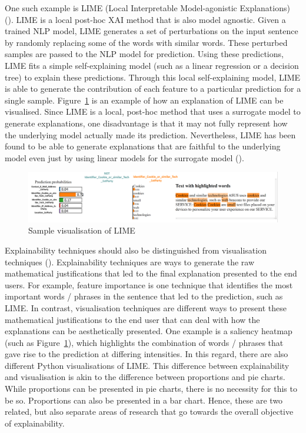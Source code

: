 One such example is LIME (Local Interpretable Model-agonistic Explanations) (\cite{lime}). LIME is a local post-hoc XAI method that is also model agnostic. Given a trained NLP model, LIME generates a set of perturbations on the input sentence by randomly replacing some of the words with similar words. These perturbed samples are passed to the NLP model for prediction. Using these predictions, LIME fits a simple self-explaining model (such as a linear regression or a decision tree) to explain these predictions. Through this local self-explaining model, LIME is able to generate the contribution of each feature to a particular prediction for a single sample. Figure~\ref{fig:lime_sample} is an example of how an explanation of LIME can be visualised. Since LIME is a local, post-hoc method that uses a surrogate model to generate explanations, one disadvantage is that it may not fully represent how the underlying model actually made its prediction. Nevertheless, LIME has been found to be able to generate explanations that are faithful to the underlying model even just by using linear models for the surrogate model (\cite{lime}).

\begin{figure}[!ht]
	\centering
	\includegraphics[width=1\linewidth]{figures/explanations_visualisations/section_4a/Picture1.png}
	\caption{Sample visualisation of LIME}   
    \label{fig:lime_sample}
\end{figure}

Explainability techniques should also be distinguished from visualisation techniques (\cite{danilevsky2020}). Explainability techniques are ways to generate the raw mathematical justifications that led to the final explanation presented to the end users. For example, feature importance is one technique that identifies the most important words / phrases in the sentence that led to the prediction, such as LIME. In contrast, visualisation techniques are different ways to present these mathematical justifications to the end user that can deal with how the explanations can be aesthetically presented. One example is a saliency heatmap (such as Figure~\ref{fig:lime_sample}), which highlights the combination of words / phrases that gave rise to the prediction at differing intensities. In this regard, there are also different Python visualisations of LIME. This difference between explainability and visualisation is akin to the difference between proportions and pie charts. While proportions can be presented in pie charts, there is no necessity for this to be so. Proportions can also be presented in a bar chart. Hence, these are two related, but also separate areas of research that go towards the overall objective of explainability.

